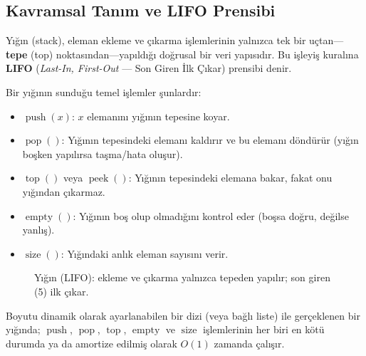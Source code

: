 \subsection{Kavramsal Tanım ve LIFO Prensibi}

\begin{definition}
Yığın (stack), eleman ekleme ve çıkarma işlemlerinin yalnızca tek bir uçtan—\textbf{tepe} (top) noktasından—yapıldığı doğrusal bir veri yapısıdır. Bu işleyiş kuralına \textbf{LIFO} (\emph{Last-In, First-Out} — Son Giren İlk Çıkar) prensibi denir.
\end{definition}

Bir yığının sunduğu temel işlemler şunlardır:
\begin{itemize}
    \item $\operatorname{push}(x)$: $x$ elemanını yığının tepesine koyar.
    \item $\operatorname{pop}()$: Yığının tepesindeki elemanı kaldırır ve bu elemanı döndürür (yığın boşken yapılırsa taşma/hata oluşur).
    \item $\operatorname{top}()$ veya $\operatorname{peek}()$: Yığının tepesindeki elemana bakar, fakat onu yığından çıkarmaz.
    \item $\operatorname{empty}()$: Yığının boş olup olmadığını kontrol eder (boşsa doğru, değilse yanlış).
    \item $\operatorname{size}()$: Yığındaki anlık eleman sayısını verir.
\end{itemize}

\begin{figure}[ht]
\centering
{}
\caption{Yığın (LIFO): ekleme ve çıkarma yalnızca tepeden yapılır;
son giren (5) ilk çıkar.}
\end{figure}

\begin{theorem}
Boyutu dinamik olarak ayarlanabilen bir dizi (veya bağlı liste) ile gerçeklenen bir yığında; $\operatorname{push}$, $\operatorname{pop}$, $\operatorname{top}$, $\operatorname{empty}$ ve $\operatorname{size}$ işlemlerinin her biri en kötü durumda ya da amortize edilmiş olarak $O(1)$ zamanda çalışır.
\end{theorem}

